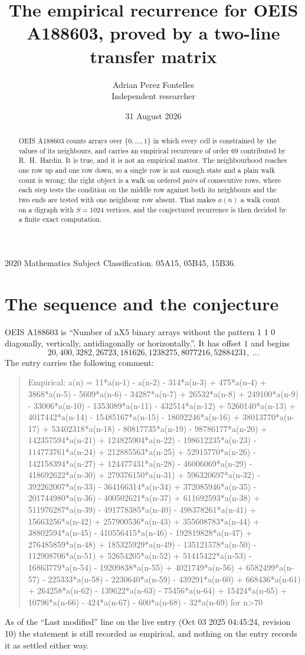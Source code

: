 \documentclass[11pt,a4paper]{article}
\title{The empirical recurrence for OEIS A188603, proved by a two-line transfer matrix}
\author{Adrian Perez Fontelles\\ \small Independent researcher}
\date{31 August 2026}
\theoremstyle{plain}
\theoremstyle{definition}
\begin{document}
\maketitle

\begin{abstract}
OEIS A188603 counts arrays over $\{0,\dots,1\}$ in which every cell is constrained by the
values of its neighbours, and carries an empirical recurrence of order $69$ contributed
by R.~H.~Hardin. It is true, and it is not an empirical matter. The neighbourhood reaches one
row up and one row down, so a single row is not enough state and a plain walk count
is wrong; the right object is a walk on ordered \emph{pairs} of consecutive rows, where
each step tests the condition on the middle row against both its neighbours and the two
ends are tested with one neighbour row absent. That makes $a(n)$ a walk count on a digraph
with $S=1024$ vertices, and the conjectured recurrence is then decided by a finite exact
computation.
\end{abstract}

\noindent\small 2020 Mathematics Subject Classification. 05A15, 05B45, 15B36.\normalsize

\section{The sequence and the conjecture}

OEIS A188603 is ``Number of nX5 binary arrays without the pattern 1 1 0 diagonally, vertically, antidiagonally or horizontally.''. It has offset $1$ and begins
\[
20, 400, 3282, 26723, 181626, 1238275, 8077216, 52884231,\ \dots
\]
The entry carries the following comment:
\begin{quote}\small
Empirical: a(n) = 11*a(n-1) - a(n-2) - 314*a(n-3) + 475*a(n-4) + 3868*a(n-5) - 5609*a(n-6) - 34287*a(n-7) + 26532*a(n-8) + 249100*a(n-9) - 33006*a(n-10) - 1353089*a(n-11) - 432514*a(n-12) + 5260140*a(n-13) + 4017442*a(n-14) - 15485167*a(n-15) - 18692246*a(n-16) + 38013770*a(n-17) + 53402318*a(n-18) - 80817735*a(n-19) - 98786177*a(n-20) + 142357594*a(n-21) + 124825904*a(n-22) - 198612235*a(n-23) - 114773761*a(n-24) + 212885563*a(n-25) + 52915770*a(n-26) - 142158394*a(n-27) + 124477431*a(n-28) - 46006069*a(n-29) - 418692622*a(n-30) + 279376150*a(n-31) + 596320697*a(n-32) - 392262007*a(n-33) - 364166314*a(n-34) + 372085946*a(n-35) - 201744980*a(n-36) - 400502621*a(n-37) + 611692593*a(n-38) + 511976287*a(n-39) - 491778385*a(n-40) - 498378261*a(n-41) + 15663256*a(n-42) + 257900536*a(n-43) + 355608783*a(n-44) + 38802594*a(n-45) - 410556415*a(n-46) - 192819828*a(n-47) + 276485859*a(n-48) + 185325929*a(n-49) - 135121578*a(n-50) - 112908706*a(n-51) + 52654205*a(n-52) + 51415422*a(n-53) - 16863779*a(n-54) - 19209838*a(n-55) + 4021749*a(n-56) + 6582499*a(n-57) - 225333*a(n-58) - 2230640*a(n-59) - 439291*a(n-60) + 668436*a(n-61) + 264258*a(n-62) - 139622*a(n-63) - 75456*a(n-64) + 15424*a(n-65) + 10796*a(n-66) - 424*a(n-67) - 600*a(n-68) - 32*a(n-69) for n>70
\end{quote}
As of the ``Last modified'' line on the live entry (Oct 03 2025 04:45:24, revision 10) the statement is
still recorded as empirical, and nothing on the entry records it as settled either way.
\end{document}
